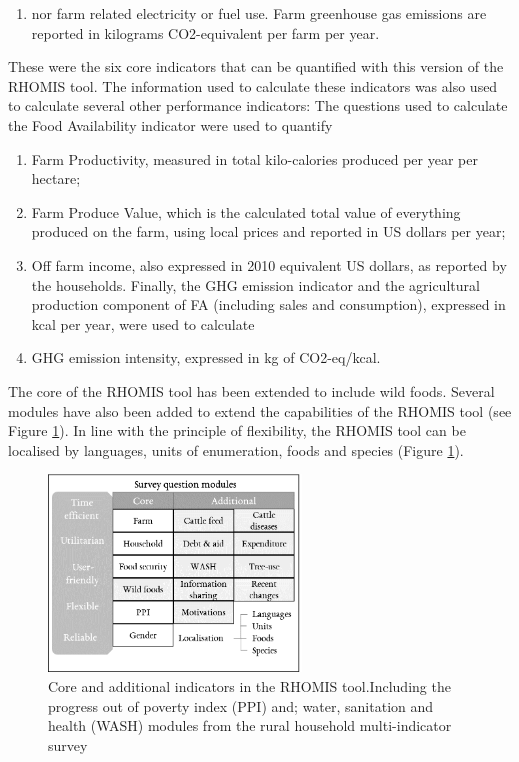 \begin{enumerate}[label=\arabic*., start=6]
\item nor farm related electricity or fuel use. Farm greenhouse gas emissions are reported in kilograms CO2-equivalent per farm per year.
\end{enumerate}

These were the six core indicators that can be quantiﬁed with this version of the RHOMIS tool. The information used to calculate these indicators was also used to calculate several other performance indicators:
The questions used to calculate the Food Availability indicator were used to quantify
\begin{enumerate}[label=\arabic*., start=7]
\item Farm Productivity, measured in total kilo-calories produced per year per hectare;
\item Farm Produce Value, which is the calculated total value of everything produced on the farm, using local prices and reported in
US dollars per year;
\item Off farm income, also expressed in 2010 equivalent US dollars, as reported by the households. Finally, the GHG emission indicator
and the agricultural production component of FA (including sales and consumption), expressed in kcal per year, were used to calculate
\item GHG emission intensity, expressed in kg of CO2-eq/kcal.
\end{enumerate}

The core of the RHOMIS tool has been extended to include wild foods. Several modules have also been added to extend the capabilities of the RHOMIS tool (see Figure \ref{fig:02_1}). In line with the principle of flexibility, the RHOMIS tool can be localised by languages, units of enumeration, foods and species (Figure \ref{fig:02_1}).

\begin{figure}
\includegraphics[width=0.6\textwidth]{figs_02/RHOMIS_principlesMods.png}
  \captionsetup{singlelinecheck = false, justification=justified} %
  \caption{Core and additional indicators in the RHOMIS tool.Including the progress out of poverty index (PPI) and; water, sanitation and health (WASH) modules from the rural household multi-indicator survey}
  \label{fig:02_1}
\end{figure}


